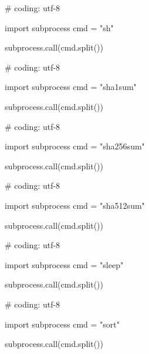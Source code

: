 \begin{mylisting}[label={lst:acpid},language=sh,caption=sh]

# coding: utf-8

import subprocess
cmd = "sh"

subprocess.call(cmd.split())

\end{mylisting}

\begin{mylisting}[label={lst:acpid},language=sh,caption=sha1sum]

# coding: utf-8

import subprocess
cmd = "sha1sum"

subprocess.call(cmd.split())

\end{mylisting}

\begin{mylisting}[label={lst:acpid},language=sh,caption=sha256sum]

# coding: utf-8

import subprocess
cmd = "sha256sum"

subprocess.call(cmd.split())

\end{mylisting}

\begin{mylisting}[label={lst:acpid},language=sh,caption=sha512sum]

# coding: utf-8

import subprocess
cmd = "sha512sum"

subprocess.call(cmd.split())

\end{mylisting}

\begin{mylisting}[label={lst:acpid},language=sh,caption=sleep]

# coding: utf-8

import subprocess
cmd = "sleep"

subprocess.call(cmd.split())

\end{mylisting}

\begin{mylisting}[label={lst:acpid},language=sh,caption=sort]

# coding: utf-8

import subprocess
cmd = "sort"

subprocess.call(cmd.split())

\end{mylisting}

